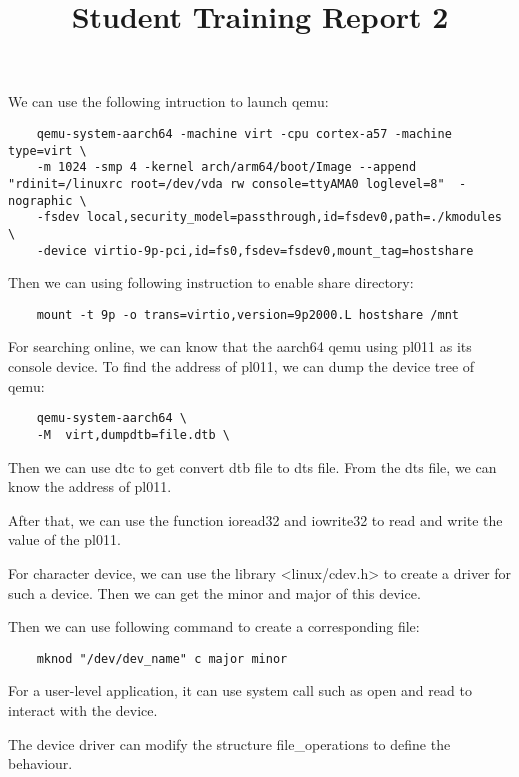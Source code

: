 \documentclass[10pt,journal,compsoc]{IEEEtran}
\begin{document}
\title{Student Training Report 2}

\maketitle
\IEEEdisplaynontitleabstractindextext
\IEEEpeerreviewmaketitle

We can use the following intruction to launch qemu:
\begin{lstlisting}
    qemu-system-aarch64 -machine virt -cpu cortex-a57 -machine type=virt \
	-m 1024 -smp 4 -kernel arch/arm64/boot/Image --append "rdinit=/linuxrc root=/dev/vda rw console=ttyAMA0 loglevel=8"  -nographic \
	-fsdev local,security_model=passthrough,id=fsdev0,path=./kmodules \
	-device virtio-9p-pci,id=fs0,fsdev=fsdev0,mount_tag=hostshare
\end{lstlisting}

Then we can using following instruction to enable share directory:
\begin{lstlisting}
    mount -t 9p -o trans=virtio,version=9p2000.L hostshare /mnt
\end{lstlisting}

For searching online, we can know that the aarch64 qemu using pl011 as its console device.
To find the address of pl011, we can dump the device tree of qemu:
\begin{lstlisting}
    qemu-system-aarch64 \
    -M  virt,dumpdtb=file.dtb \
\end{lstlisting}

Then we can use dtc to get convert dtb file to dts file.
From the dts file, we can know the address of pl011.

After that, we can use the function ioread32 and iowrite32 to 
read and write the value of the pl011.

For character device, we can use the library <linux/cdev.h> to 
create a driver for such a device. Then we can get the 
minor and major of this device.

Then we can use following command to create a corresponding file: 
\begin{lstlisting}
    mknod "/dev/dev_name" c major minor 
\end{lstlisting}

For a user-level application, it can use system call such as open and read
to interact with the device.

The device driver can modify the structure file_operations to define the behaviour. 
\end{document}

